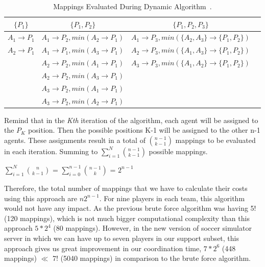 \begin{table}[t!]
\label{tab:DynamicTable}
\centering
    \begin{tabular}{ | c | c | c | p{5cm} |}
    \hline
    $\lbrace P_{1} \rbrace$   & $\lbrace P_{1},P_{2} \rbrace$ 	& $\lbrace P_{1},P_{2},P_{3} \rbrace$\\ \hline
    $A_{1} \rightarrow P_{1}$ & $A_{1} \rightarrow P_{2},min(A_{2} \rightarrow P_{1})$	 	& $A_{1} \rightarrow P_{3},min(\lbrace A_{2},A_{3} \rbrace \rightarrow \lbrace P_{1},P_{2} \rbrace)$  \\ \hline
    $A_{2} \rightarrow P_{1}$ & $A_{1} \rightarrow P_{1},min(A_{3} \rightarrow P_{1})$	 	& $A_{2} \rightarrow P_{3},min(\lbrace A_{1},A_{3} \rbrace \rightarrow \lbrace P_{1},P_{2} \rbrace)$  \\ \hline
     						  & $A_{2} \rightarrow P_{2},min(A_{1} \rightarrow P_{1})$ 		& $A_{3} \rightarrow P_{3},min(\lbrace A_{1},A_{2} \rbrace \rightarrow \lbrace P_{1},P_{2} \rbrace)$  \\ \hline
       						  & $A_{2} \rightarrow P_{2},min(A_{3} \rightarrow P_{1})$ 		&   \\ \hline
       						  & $A_{3} \rightarrow P_{2},min(A_{1} \rightarrow P_{1})$ 		&   \\ \hline
    						  & $A_{3} \rightarrow P_{2},min(A_{2} \rightarrow P_{1})$		&   \\
    \hline

    \end{tabular}
    
    \caption{Mappings Evaluated During Dynamic Algorithm~\cite{UtAustinVillaPaper}.}    
\end{table}
Remind that in the \textit{Kth} iteration of the algorithm, each agent will be assigned to the $P_{K}$ position. Then the possible positions K-1 will be assigned to the other n-1 agents. These assignments result in a total of $ {{n-1}\choose{k-1}} $ mappings to be evaluated in each iteration. Summing to $\sum\limits_{i=1}^N{{n-1}\choose{k-1}}$ possible mappings.\\
\begin{center}
$\sum\limits_{i=1}^N{{n}\choose{k-1}}$ = $\sum\limits_{i=0}^{n-1}{{n-1}\choose{k}}$ = $2^{n-1}$
\end{center}
Therefore, the total number of mappings that we have to calculate their costs using this approach are $n2^{n-1}$. For nine players in each team, this algorithm would not have any impact. As the previous brute force algorithm was having 5! (120 mappings), which is not much bigger computational complexity than this approach $5 \ast 2^{4}$ (80 mappings). However, in the new version of soccer simulator server in which we can have up to seven players in our support subset, this approach gives us great improvement in our coordination time, $7 \ast 2^{6}$ (448 mappings) $\ll$ 7! (5040 mappings) in comparison to the brute force algorithm.

